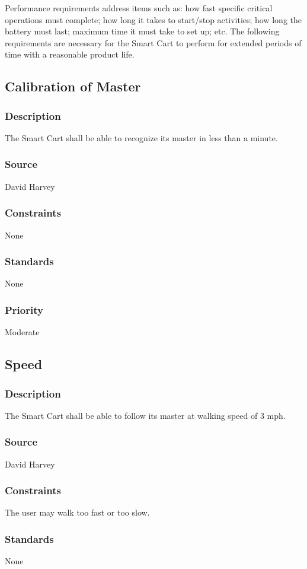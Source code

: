 Performance requirements address items such as: how fast specific critical operations must complete; how long it takes to start/stop activities; how long the battery must last; maximum time it must take to set up; etc. The following requirements are necessary for the Smart Cart to perform for extended periods of time with a reasonable product life. 

\subsection{Calibration of Master}
\subsubsection{Description}
The Smart Cart shall be able to recognize its master in less than a minute.
\subsubsection{Source}
David Harvey
\subsubsection{Constraints}
None
\subsubsection{Standards}
None
\subsubsection{Priority}
Moderate

\subsection{Speed}
\subsubsection{Description}
The Smart Cart shall be able to follow its master at walking speed of 3 mph. 
\subsubsection{Source}
David Harvey
\subsubsection{Constraints}
The user may walk too fast or too slow. 
\subsubsection{Standards}
None
